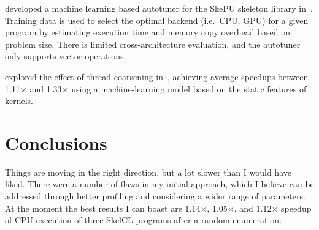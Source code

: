\citeauthor{Dastgeer2011} developed a machine learning based autotuner
for the SkePU skeleton library in~\cite{Dastgeer2011}. Training data
is used to select the optimal backend (i.e.\ CPU, GPU) for a given
program by estimating execution time and memory copy overhead based on
problem size. There is limited cross-architecture evaluation, and the
autotuner only supports vector operations.






\citeauthor{Magni2014} explored the effect of thread coarsening
in~\cite{Magni2014}, achieving average speedups between 1.11$\times$
and 1.33$\times$ using a machine-learning model based on the static
features of kernels.

\section{Conclusions}

Things are moving in the right direction, but a lot slower than I
would have liked. There were a number of flaws in my initial approach,
which I believe can be addressed through better profiling and
considering a wider range of parameters. At the moment the best
results I can boast are 1.14$\times$, 1.05$\times$, and 1.12$\times$
speedup of CPU execution of three SkelCL programs after a random
enumeration.

\label{bibliography}
\printbibliography

